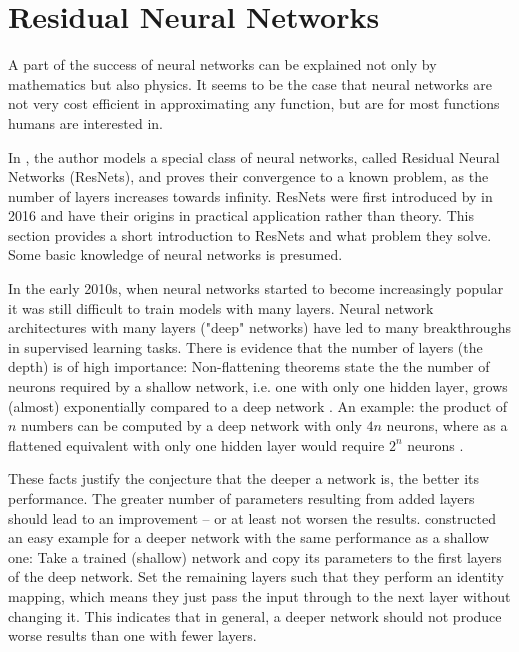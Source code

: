 \section{Residual Neural Networks}
\label{sec:neural-networks}

A part of the success of neural networks can be explained not only by mathematics but also physics.
It seems to be the case that neural networks are not very cost efficient in approximating any function, but are for most functions humans are interested in.

In \cite{owhadi20}, the author models a special class of neural networks, called Residual Neural Networks (ResNets), and proves their convergence to a known problem, as the number of layers increases towards infinity.
ResNets were first introduced by \citet{he16} in 2016 and have their origins in practical application rather than theory.
This section provides a short introduction to ResNets and what problem they solve.
Some basic knowledge of neural networks is presumed.

In the early 2010s, when neural networks started to become increasingly popular it was still difficult to train models with many layers.
Neural network architectures with many layers ("deep" networks) have led to many breakthroughs in supervised learning tasks.
There is evidence that the number of layers (the depth) is of high importance:
Non-flattening theorems state the the number of neurons required by a shallow network, i.e. one with only one hidden layer, grows (almost) exponentially compared to a deep network \cite{lin17,delalleau11}.
An example: the product of $n$ numbers can be computed by a deep network with only $4n$ neurons, where as a flattened equivalent with only one hidden layer would require $2^n$ neurons \cite{lin17}.

These facts justify the conjecture that the deeper a network is, the better its performance.
The greater number of parameters resulting from added layers should lead to an improvement --  or at least not worsen the results.
\citet{he16} constructed an easy example for a deeper network with the same performance as a shallow one:
Take a trained (shallow) network and copy its parameters to the first layers of the deep network.
Set the remaining layers such that they perform an identity mapping, which means they just pass the input through to the next layer without changing it.
This indicates that in general, a deeper network should not produce worse results than one with fewer layers.

